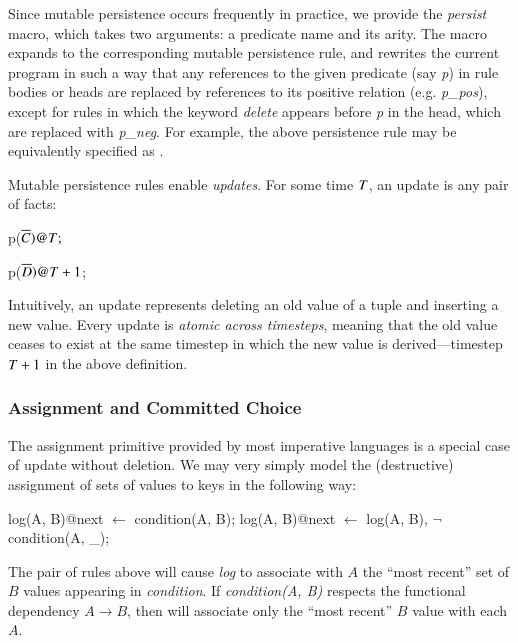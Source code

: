 Since mutable persistence occurs frequently in practice, we provide the {\em
persist} macro, which takes 
two arguments: a predicate name and its arity. 
The macro
expands to the corresponding mutable persistence rule, and rewrites the current program
in such a way that any references to the given predicate (say \emph{p}) in rule bodies or heads are replaced by references
to its positive relation (e.g. \emph{p\_pos}), except for rules in which the keyword \emph{delete} 
appears before \emph{p} in the head, which are replaced with \emph{p\_neg}.  For example, the above
 persistence rule may be equivalently specified as
.

Mutable persistence rules enable {\em updates}.  For some time $\DT$, an
update is any pair of facts:

\begin{dedalus}
p\nega($\overline{C})@\DT;$
\end{dedalus}

\begin{dedalus}
p\pos($\overline{D})@\DT+1$;
\end{dedalus}


\noindent
Intuitively, an update represents deleting an old value of a tuple and
inserting a new value.  Every update is {\em atomic across timesteps}, meaning
that the old value ceases to exist at the same timestep in which the new value
is derived---timestep $\DT+1$ in the above definition.

\subsubsection{Assignment and Committed Choice}

The assignment primitive provided by most imperative languages is a special 
case of update without deletion.  We may very simply model the (destructive) assignment 
of sets of values to keys in the following way:

\begin{Dedalus}
log(A, B)@next \(\leftarrow\) condition(A, B);
log(A, B)@next \(\leftarrow\) log(A, B), \(\lnot\)condition(A, _);
\end{Dedalus}

The pair of rules above will cause {\em log} to associate with $A$ the ``most recent'' set of
$B$ values appearing in {\em condition}.  If {\em condition(A, B)} respects the functional dependency $A \to B$, then
 will associate only the ``most recent'' $B$ value with each $A$.

